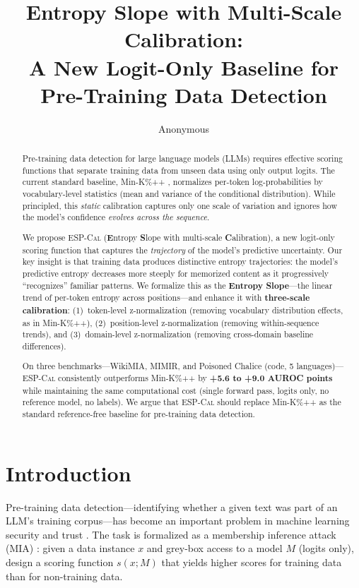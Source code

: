 \documentclass[11pt]{article}
\title{Entropy Slope with Multi-Scale Calibration:\\A New Logit-Only Baseline for Pre-Training Data Detection}
\author{Anonymous}
\newcommand{\ours}{\textsc{ESP-Cal}}
\begin{document}
\maketitle

\begin{abstract}
Pre-training data detection for large language models (LLMs) requires effective scoring functions that separate training data from unseen data using only output logits.
The current standard baseline, Min-K\%++ \citep{zhang2024minkpp}, normalizes per-token log-probabilities by vocabulary-level statistics (mean and variance of the conditional distribution).
While principled, this \textit{static} calibration captures only one scale of variation and ignores how the model's confidence \textit{evolves across the sequence}.

We propose \ours{} (\textbf{E}ntropy \textbf{S}lope with multi-scale \textbf{C}alibration), a new logit-only scoring function that captures the \textit{trajectory} of the model's predictive uncertainty.
Our key insight is that training data produces distinctive entropy trajectories: the model's predictive entropy decreases more steeply for memorized content as it progressively ``recognizes'' familiar patterns.
We formalize this as the \textbf{Entropy Slope}---the linear trend of per-token entropy across positions---and enhance it with \textbf{three-scale calibration}:
(1)~token-level z-normalization (removing vocabulary distribution effects, as in Min-K\%++),
(2)~position-level z-normalization (removing within-sequence trends), and
(3)~domain-level z-normalization (removing cross-domain baseline differences).

On three benchmarks---WikiMIA, MIMIR, and Poisoned Chalice (code, 5 languages)---\ours{} consistently outperforms Min-K\%++ by \textbf{+5.6 to +9.0 AUROC points} while maintaining the same computational cost (single forward pass, logits only, no reference model, no labels).
We argue that \ours{} should replace Min-K\%++ as the standard reference-free baseline for pre-training data detection.

\end{abstract}

\section{Introduction}
\label{sec:intro}

Pre-training data detection---identifying whether a given text was part of an LLM's training corpus---has become an important problem in machine learning security and trust \citep{carlini2021extracting, shi2024detecting}.
The task is formalized as a membership inference attack (MIA) \citep{shokri2017membership}: given a data instance $x$ and grey-box access to a model $M$ (logits only), design a scoring function $s(x; M)$ that yields higher scores for training data than for non-training data.
\end{document}
